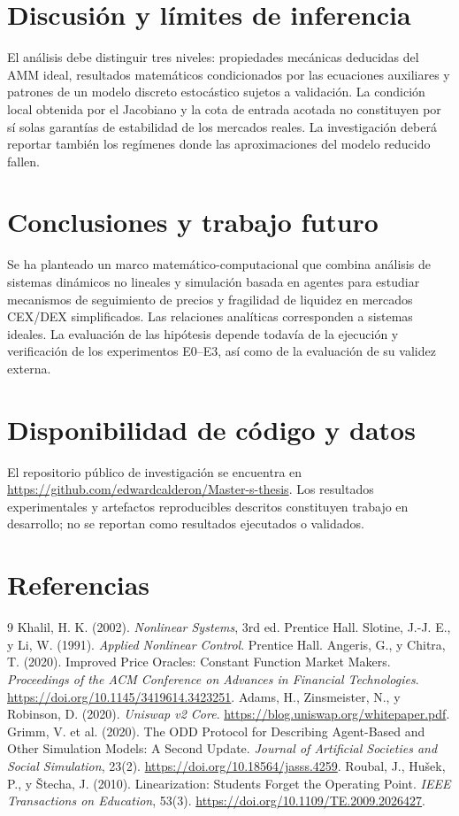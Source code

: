 \documentclass[11pt,a4paper]{article}
\begin{document}
\section{Discusión y límites de inferencia}
El análisis debe distinguir tres niveles: propiedades mecánicas deducidas del AMM ideal, resultados matemáticos condicionados por las ecuaciones auxiliares y patrones de un modelo discreto estocástico sujetos a validación. La condición local obtenida por el Jacobiano y la cota de entrada acotada no constituyen por sí solas garantías de estabilidad de los mercados reales. La investigación deberá reportar también los regímenes donde las aproximaciones del modelo reducido fallen.

\section{Conclusiones y trabajo futuro}
Se ha planteado un marco matemático-computacional que combina análisis de sistemas dinámicos no lineales y simulación basada en agentes para estudiar mecanismos de seguimiento de precios y fragilidad de liquidez en mercados CEX/DEX simplificados. Las relaciones analíticas corresponden a sistemas ideales. La evaluación de las hipótesis depende todavía de la ejecución y verificación de los experimentos E0--E3, así como de la evaluación de su validez externa.

\section*{Disponibilidad de código y datos}
El repositorio público de investigación se encuentra en \url{https://github.com/edwardcalderon/Master-s-thesis}. Los resultados experimentales y artefactos reproducibles descritos constituyen trabajo en desarrollo; no se reportan como resultados ejecutados o validados.

\section*{Referencias}
\begin{thebibliography}{9}
 Khalil, H. K. (2002). \emph{Nonlinear Systems}, 3rd ed. Prentice Hall.
 Slotine, J.-J. E., y Li, W. (1991). \emph{Applied Nonlinear Control}. Prentice Hall.
 Angeris, G., y Chitra, T. (2020). Improved Price Oracles: Constant Function Market Makers. \emph{Proceedings of the ACM Conference on Advances in Financial Technologies}. \url{https://doi.org/10.1145/3419614.3423251}.
 Adams, H., Zinsmeister, N., y Robinson, D. (2020). \emph{Uniswap v2 Core}. \url{https://blog.uniswap.org/whitepaper.pdf}.
 Grimm, V. et al. (2020). The ODD Protocol for Describing Agent-Based and Other Simulation Models: A Second Update. \emph{Journal of Artificial Societies and Social Simulation}, 23(2). \url{https://doi.org/10.18564/jasss.4259}.
 Roubal, J., Hu\v{s}ek, P., y \v{S}techa, J. (2010). Linearization: Students Forget the Operating Point. \emph{IEEE Transactions on Education}, 53(3). \url{https://doi.org/10.1109/TE.2009.2026427}.
\end{thebibliography}
\end{document}

